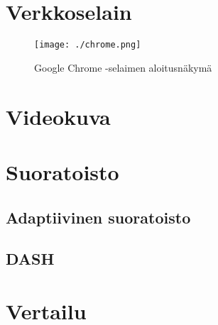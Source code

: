 \documentclass[finnish, 12pt, a4paper, elec, utf8, a-1b, online]{aaltothesis}
\begin{document}
\clearpage



\section{Verkkoselain}

\begin{figure}[htb]
  \centering
  \texttt{[image: ./chrome.png]}
  \caption{Google Chrome -selaimen aloitusnäkymä
  \label{kuva1}}
\end{figure}

\clearpage


\section{Videokuva}


\clearpage


\section{Suoratoisto}


\subsection*{Adaptiivinen suoratoisto}


\subsection*{DASH}


\clearpage


\section{Vertailu}
\end{document}
